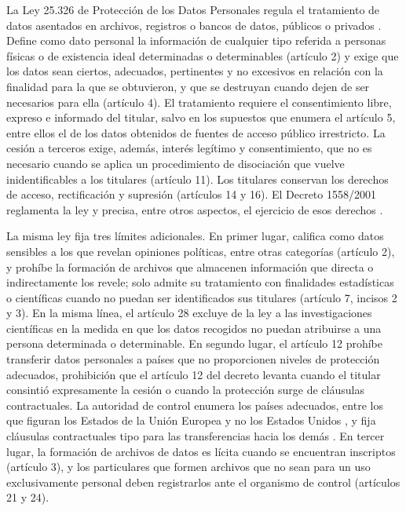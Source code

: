 La Ley 25.326 de Protección de los Datos Personales regula el tratamiento de datos asentados en archivos, registros o bancos de datos, públicos o privados \parencite{CongresoNacion2000}. Define como dato personal la información de cualquier tipo referida a personas físicas o de existencia ideal determinadas o determinables (artículo 2) y exige que los datos sean ciertos, adecuados, pertinentes y no excesivos en relación con la finalidad para la que se obtuvieron, y que se destruyan cuando dejen de ser necesarios para ella (artículo 4). El tratamiento requiere el consentimiento libre, expreso e informado del titular, salvo en los supuestos que enumera el artículo 5, entre ellos el de los datos obtenidos de fuentes de acceso público irrestricto. La cesión a terceros exige, además, interés legítimo y consentimiento, que no es necesario cuando se aplica un procedimiento de disociación que vuelve inidentificables a los titulares (artículo 11). Los titulares conservan los derechos de acceso, rectificación y supresión (artículos 14 y 16). El Decreto 1558/2001 reglamenta la ley y precisa, entre otros aspectos, el ejercicio de esos derechos \parencite{PoderEjecutivoNacional2001}.

La misma ley fija tres límites adicionales. En primer lugar, califica como datos sensibles a los que revelan opiniones políticas, entre otras categorías (artículo 2), y prohíbe la formación de archivos que almacenen información que directa o indirectamente los revele; solo admite su tratamiento con finalidades estadísticas o científicas cuando no puedan ser identificados sus titulares (artículo 7, incisos 2 y 3). En la misma línea, el artículo 28 excluye de la ley a las investigaciones científicas en la medida en que los datos recogidos no puedan atribuirse a una persona determinada o determinable. En segundo lugar, el artículo 12 prohíbe transferir datos personales a países que no proporcionen niveles de protección adecuados, prohibición que el artículo 12 del decreto levanta cuando el titular consintió expresamente la cesión o cuando la protección surge de cláusulas contractuales. La autoridad de control enumera los países adecuados, entre los que figuran los Estados de la Unión Europea y no los Estados Unidos \parencite{DNPDP2016}, y fija cláusulas contractuales tipo para las transferencias hacia los demás \parencite{DNPDP2016}. En tercer lugar, la formación de archivos de datos es lícita cuando se encuentran inscriptos (artículo 3), y los particulares que formen archivos que no sean para un uso exclusivamente personal deben registrarlos ante el organismo de control (artículos 21 y 24).


